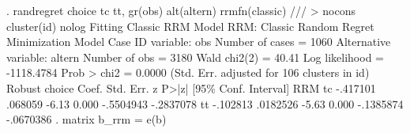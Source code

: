 . randregret choice  tc tt, gr(obs) alt(altern) rrmfn(classic) ///
> nocons cluster(id)  nolog
Fitting Classic RRM Model 
{\smallskip}
RRM: Classic Random Regret Minimization Model
{\smallskip}
Case ID variable: obs                          Number of cases    =       1060
Alternative variable: altern                   Number of obs      =       3180
                                               Wald chi2(2)       =      40.41
Log likelihood = -1118.4784                    Prob > chi2        =     0.0000
                                 (Std. Err. adjusted for   106 clusters in id)
             {\VBAR}               Robust
      choice {\VBAR}      Coef.   Std. Err.      z    P>|z|     [95\% Conf. Interval]
RRM          {\VBAR}
          tc {\VBAR}   -.417101    .068059    -6.13   0.000    -.5504943   -.2837078
          tt {\VBAR}   -.102813   .0182526    -5.63   0.000    -.1385874   -.0670386
{\smallskip}
. matrix b_rrm = e(b)
{\smallskip}
